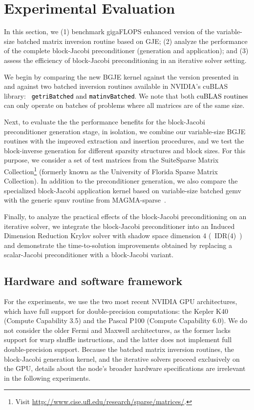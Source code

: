 \section{Experimental Evaluation}
\label{2017-gje-block-jacobi:s4-experiments}

In this section, we (1) benchmark gigaFLOPS enhanced version of the variable-size
batched matrix inversion routine based on GJE; (2)
analyze the performance of the complete block-Jacobi preconditioner (generation
and application); and
(3)
assess the efficiency of block-Jacobi preconditioning in an iterative solver
setting.

We begin by comparing the new BGJE kernel against the
version presented in~\cite{Anzt:2017:BGE:3026937.3026940} and against two batched
inversion routines available in NVIDIA's cuBLAS library: \textcolor{black}{{\tt
getriBatched} and {\tt matinvBatched}}. We note that both
\textcolor{black}{cuBLAS routines} can only operate on batches of problems where
all matrices are of the same size.

Next, to evaluate the the performance benefits for the block-Jacobi
preconditioner generation stage, in isolation, we combine our variable-size BGJE
routines with the improved extraction and insertion procedures, and we test the
block-inverse generation for different sparsity structures and block sizes. For
this purpose, we consider a set of test matrices from the SuiteSparse Matrix
Collection\footnote{Visit
	\url{http://www.cise.ufl.edu/research/sparse/matrices/}.} (formerly known as the
University of Florida Sparse Matrix Collection).
In addition to the preconditioner generation, we also compare the specialized
block-Jacobi application kernel based on variable-size batched {\sc gemv} with
the generic {\sc spmv} routine from MAGMA-sparse~\cite{magma}.

Finally, to analyze the practical effects of the block-Jacobi preconditioning on
an iterative solver, we integrate the block-Jacobi preconditioner into an Induced 
Dimension Reduction Krylov solver with shadow space dimension 4 (~IDR(4)~) and demonstrate the time-to-solution 
improvements obtained by replacing a scalar-Jacobi preconditioner with a 
block-Jacobi variant.

\subsection{Hardware and software framework}

For the experiments, we use the two most recent NVIDIA GPU architectures, which have full
support for double-precision computations: the Kepler K40 (Compute Capability
3.5)
and the Pascal P100 (Compute Capability 6.0).
We do not consider the older
Fermi and Maxwell architectures, as the former lacks support for warp shuffle
instructions, and the latter does not implement full double-precision support.
Because the batched matrix inversion routines, the block-Jacobi generation kernel,
and the iterative solvers proceed exclusively on the GPU, details about the node's
broader hardware specifications are irrelevant in the following experiments.

